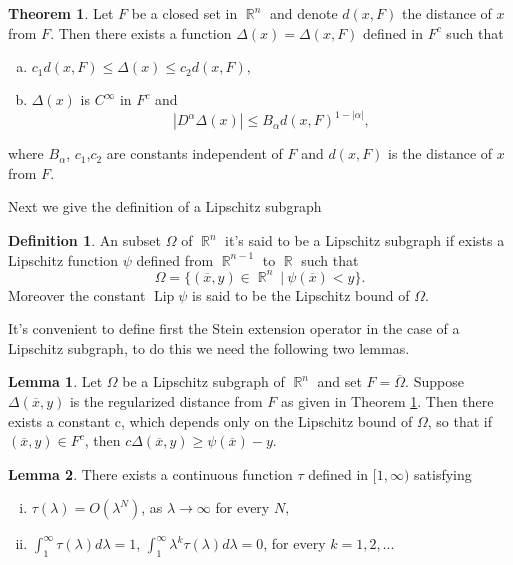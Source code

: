 \documentclass[12pt]{article}
\theoremstyle{definition}
\newtheorem{definition}{Definition}
\newtheorem{theorem}{Theorem}
\newtheorem{lemma}{Lemma}
\DeclareMathOperator\Lip{Lip}
\DeclareMathOperator\rr{\mathbb{R}}
\begin{document}
\begin{theorem}\label{regdist}
Let $F$ be a closed set in $\rr^n$ and denote $d(x,F)$ the distance of $x$ from $F$. Then there exists a function $\Delta(x)=\Delta(x,F)$ defined in $F^c$ such that
\begin{enumerate}[a)]
\item $c_1 d(x,F)\le \Delta(x)\le c_2d (x,F),$  
\item $\Delta(x)$ is $C^\infty$ in $F^c$ and
\[ \left | D^\alpha \Delta(x) \right | \le B_\alpha d(x,F)^{1-|\alpha|},\]
\end{enumerate}
where $B_\alpha$, $c_1$,$c_2$ are constants independent of $F$ and $d(x,F)$ is the distance of $x$ from $F.$
\end{theorem}
Next we give the definition of a Lipschitz subgraph 
\begin{definition}
An subset $\Omega$ of $\rr^n$ it's said to be a Lipschitz subgraph if exists a Lipschitz function $\psi$ defined from $\rr^{n-1}$ to $\rr$ such that
\[ \Omega=\{(\overline x, y) \in \rr^n \ | \ \psi(\overline x)<y \}.\]
Moreover the constant $\Lip \psi$ is said to be the Lipschitz bound of $\Omega.$ 
\end{definition}
It's convenient to define first the Stein extension operator in the case of a Lipschitz subgraph, to do this we need the following two lemmas.
\begin{lemma}\label{lemma1}
Let $\Omega$ be a Lipschitz subgraph of $\rr^n$ and set $F=\overline \Omega$. Suppose $\Delta(\overline x, y)$ is the regularized distance from $F$ as given in Theorem \ref{regdist}. Then there exists a constant c, which depends only on the Lipschitz bound of $\Omega$, so that if $(\overline x, y) \in F^c$, then $c\Delta(\overline x,y)\ge \psi(\overline x)- y.$
\end{lemma}

\begin{lemma}\label{lemma2}
There exists a continuous function $\tau$ defined in $[1,\infty)$ satisfying
\begin{enumerate}[i)]
	\item $\tau(\lambda)=O(\lambda^N)$, as $\lambda \rightarrow \infty$ for every $N,$
	\item $\int_1^\infty \tau(\lambda)d\lambda=1$, $\int_1^\infty \lambda^k\tau(\lambda)d\lambda=0$, for every $k=1,2,...$
\end{enumerate}
\end{lemma}
\end{document}
